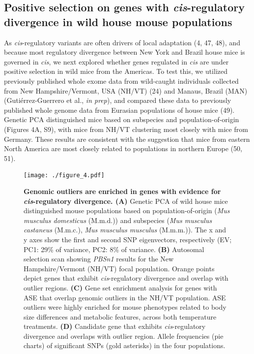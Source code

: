 \documentclass[9pt,twocolumn,twoside,lineno]{pnas-new}
\begin{document}
\hypertarget{positive-selection-on-genes-with-cis-regulatory-divergence-in-wild-house-mouse-populations}{%
\subsection*{\texorpdfstring{Positive selection on genes with
\emph{cis}-regulatory divergence in wild house mouse
populations}{Positive selection on genes with cis-regulatory divergence in wild house mouse populations}}\label{positive-selection-on-genes-with-cis-regulatory-divergence-in-wild-house-mouse-populations}}

As \emph{cis}-regulatory variants are often drivers of local adaptation
(4, 47, 48), and because most regulatory divergence between New York and
Brazil house mice is governed in \emph{cis}, we next explored whether
genes regulated in \emph{cis} are under positive selection in wild mice
from the Americas. To test this, we utilized previously published whole
exome data from wild-caught individuals collected from New
Hampshire/Vermont, USA (NH/VT) (24) and Manaus, Brazil (MAN)
(Gutiérrez-Guerrero et al., \emph{in prep}), and compared these data to
previously published whole genome data from Eurasian populations of
house mice (49). Genetic PCA distinguished mice based on subspecies and
population-of-origin (Figures 4A, S9), with mice from NH/VT clustering
most closely with mice from Germany. These results are consistent with
the suggestion that mice from eastern North America are most closely
related to populations in northern Europe (50, 51).

\begin{figure}[t]
  \texttt{[image: ./figure\_4.pdf]}
  \caption{\textbf{Genomic outliers are enriched in genes with evidence for} \textbf{\textit{cis}-regulatory divergence. (A)} Genetic PCA of wild house mice distinguished mouse populations based on population-of-origin (\textit{Mus musculus domesticus} (M.m.d.)) and subspecies (\textit{Mus musculus castaneus} (M.m.c.), \textit{Mus musculus musculus} (M.m.m.)). The x and y axes show the first and second SNP eigenvectors, respectively (EV; PC1: 29\% of variance, PC2: 8\% of variance. \textbf{(B)} Autosomal selection scan showing \textit{PBSn1} results for the New Hampshire/Vermont (NH/VT) focal population. Orange points depict genes that exhibit \textit{cis}-regulatory divergence and overlap with outlier regions. \textbf{(C)} Gene set enrichment analysis for genes with ASE that overlap genomic outliers in the NH/VT population. ASE outliers were highly enriched for mouse phenotypes related to body size differences and metabolic features, across both temperature treatments. \textbf{(D)} Candidate gene that exhibits \textit{cis}-regulatory divergence and overlaps with outlier region. Allele frequencies (pie charts) of significant SNPs (gold asterisks) in the four populations.}
\end{figure}
\end{document}
